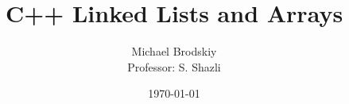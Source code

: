 


\def\code#1{\texttt{#1}}

\pagestyle{fancy}

\title{C++ Linked Lists and Arrays}
\date{\today}
\author{Michael Brodskiy\\ \small Professor: S. Shazli}



\maketitle

\thispagestyle{fancy}

\newpage

